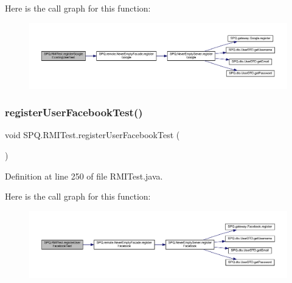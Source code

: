 Here is the call graph for this function\+:\nopagebreak
\begin{figure}[H]
\begin{center}
\leavevmode
\includegraphics[width=350pt]{class_s_p_q_1_1_r_m_i_test_ad375aaea37b3b8f68c670f4c09834a7b_cgraph}
\end{center}
\end{figure}
\mbox{\label{class_s_p_q_1_1_r_m_i_test_aaba807356f43d06d07e10da5ce5a53c6}} 
\subsubsection{\texorpdfstring{register\+User\+Facebook\+Test()}{registerUserFacebookTest()}}
{\footnotesize\ttfamily void S\+P\+Q.\+R\+M\+I\+Test.\+register\+User\+Facebook\+Test (\begin{DoxyParamCaption}{ }\end{DoxyParamCaption})}



Definition at line 250 of file R\+M\+I\+Test.\+java.

Here is the call graph for this function\+:\nopagebreak
\begin{figure}[H]
\begin{center}
\leavevmode
\includegraphics[width=350pt]{class_s_p_q_1_1_r_m_i_test_aaba807356f43d06d07e10da5ce5a53c6_cgraph}
\end{center}
\end{figure}
\mbox{\label{class_s_p_q_1_1_r_m_i_test_a18c26a1a1882c74b0ff9a0142c9492c8}} 
